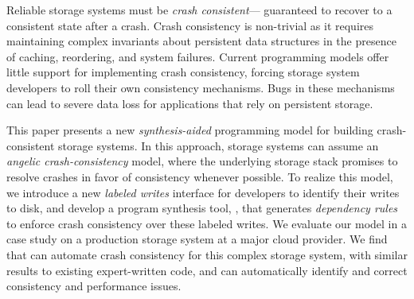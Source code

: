 Reliable storage systems must be \emph{crash consistent}---%
guaranteed to recover to a consistent state after a crash. %
Crash consistency is non-trivial
as it requires maintaining complex invariants
about persistent data structures 
in the presence of caching, reordering, and system failures.
Current programming models offer little support for implementing crash consistency,
forcing storage system developers to roll their own consistency mechanisms.
Bugs in these mechanisms can lead to severe data loss
for applications that rely on persistent storage.\tighten

This paper presents a new \emph{synthesis-aided} programming model
for building crash-consistent storage systems.
In this approach, storage systems can assume
an \emph{angelic crash-consistency} model,
where the underlying storage stack
promises to resolve crashes in favor of consistency whenever possible.
To realize this model,
we introduce a new \emph{labeled writes} interface for developers to identify their writes to disk,
and develop a program synthesis tool, \depsynth,
that generates \emph{dependency rules}
to enforce crash consistency over these labeled writes.
We evaluate our model in a case study
on a production storage system at a major cloud provider.
We find that \depsynth can automate crash consistency for this complex storage system,
with similar results to existing expert-written code,
and can automatically identify and correct consistency and performance issues.
